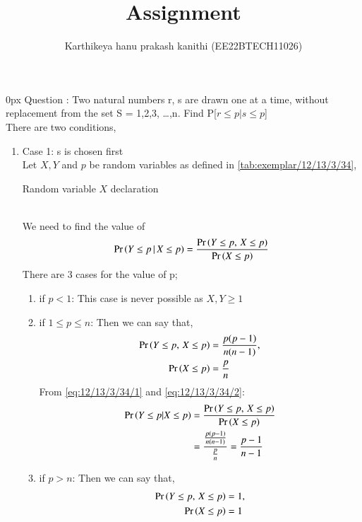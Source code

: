 \documentclass[article]{IEEEtran}
\theoremstyle{remark}
\begin{document}
\let\vec\mathbf


\title{
Assignment
}
\author{ Karthikeya hanu prakash kanithi (EE22BTECH11026)}
\maketitle
\parindent0px
\vspace{3cm}
Question : Two natural numbers r, s are drawn one at a time, without replacement from
the set S = {1,2,3, \ldots,n}. Find P[$r\le p|s\le p$]
\\\solution 
There are two conditions, 
\begin{enumerate}
\item Case 1: s is chosen first
\\Let $X,Y$ and $p$ be random variables as defined in  \autoref{tab:exemplar/12/13/3/34},
\begin{table}[h]
	\centering
	
	\caption{Random variable $X$ declaration}
        \label{tab:exemplar/12/13/3/34}
\end{table}
\\We need to find the value of
\begin{align}
\Pr\left(Y\le p\,|\,X\le p\right) = \frac{\Pr\left(Y \le p, \, X \le p\right)}{\Pr\left(X \le p\right)}
\end{align}
There are 3 cases for the value of p;
\begin{enumerate}
\item if $p<1$:
This case is never possible as $X,Y \ge 1$
\item if $1 \le p \le n$:
Then we can say that,
\begin{align}
\Pr\left(Y \le p, \, X \le p\right) &= \frac{p(p-1)}{n(n-1)} \label{eq:12/13/3/34/1},\\
\Pr\left(X \le p\right) &= \frac{p}{n} \label{eq:12/13/3/34/2}
\end{align}
From \eqref{eq:12/13/3/34/1} and \eqref{eq:12/13/3/34/2}:
\begin{align}
\Pr\left(Y\le p|X\le p\right) &= \frac{\Pr\left(Y \le p, \, X \le p\right)}{\Pr\left(X \le p\right)}\\
&= \frac{\frac{p(p-1)}{n(n-1)}}{\frac{p}{n}}
=\frac{p-1}{n-1}
\end{align}
\item if $p>n$:
Then we can say that,
\begin{align}
\pr{Y \le p, \, X \le p} &= 1 \label{eq:12/13/3/34/3},\\
\pr{X \le p} &= 1 \label{eq:12/13/3/34/4}

\end{align}
\end{enumerate}
\end{enumerate}
\end{document}
